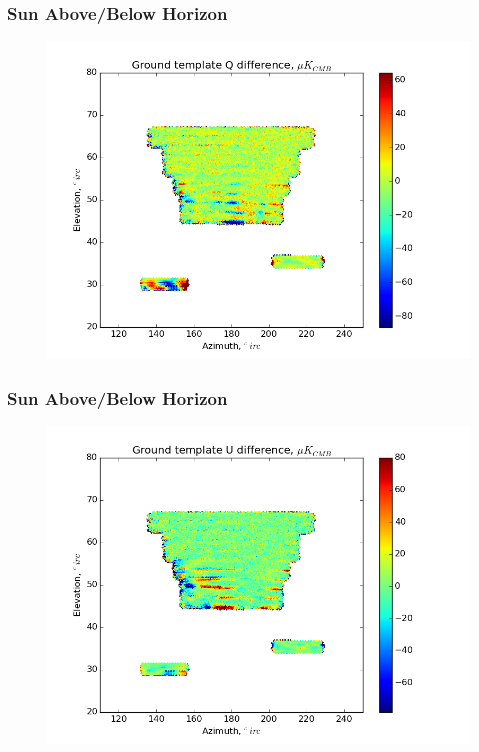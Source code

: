 \documentclass{beamer}
\begin{document}
\begin{frame}
\frametitle{Sun Above/Below Horizon}
\begin{figure}
\includegraphics[width=0.9\linewidth]{dQ_gt_SUN_HORIZON.png}
\end{figure}
\end{frame}

\begin{frame}
\frametitle{Sun Above/Below Horizon}
\begin{figure}
\includegraphics[width=0.9\linewidth]{dU_gt_SUN_HORIZON.png}
\end{figure}
\end{frame}
\end{document}
